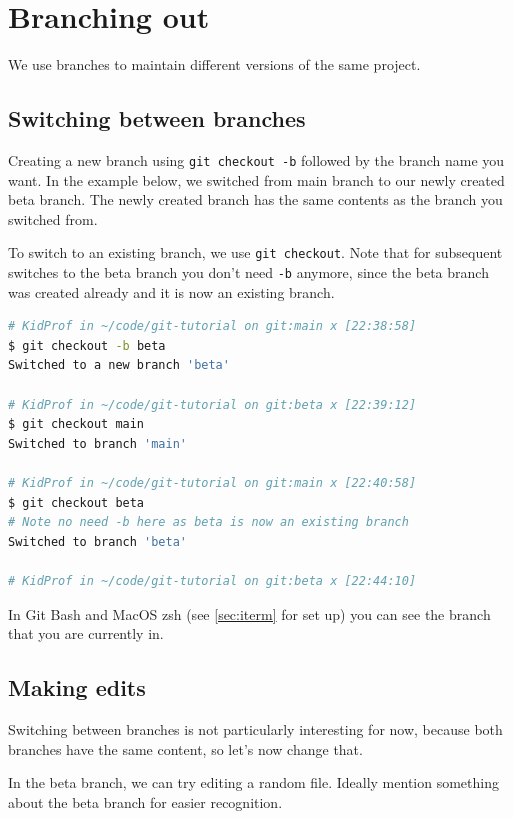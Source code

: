 \section{Branching out}
\label{sec:branch}

We use branches to maintain different versions of the same project. 

\subsection*{Switching between branches}

Creating a new branch using \texttt{git checkout -b} followed by the branch name you want. In the example below, we switched from main branch to our newly created beta branch. The newly created branch has the same contents as the branch you switched from.

To switch to an existing branch, we use \texttt{git checkout}. Note that for subsequent switches to the beta branch you don't need \texttt{-b} anymore, since the beta branch was created already and it is now an existing branch.

\begin{lstlisting}[language=bash]
# KidProf in ~/code/git-tutorial on git:main x [22:38:58]
$ git checkout -b beta
Switched to a new branch 'beta'

# KidProf in ~/code/git-tutorial on git:beta x [22:39:12]
$ git checkout main
Switched to branch 'main'

# KidProf in ~/code/git-tutorial on git:main x [22:40:58]
$ git checkout beta
# Note no need -b here as beta is now an existing branch
Switched to branch 'beta'

# KidProf in ~/code/git-tutorial on git:beta x [22:44:10]
\end{lstlisting}

In Git Bash and MacOS zsh (see \cref{sec:iterm} for set up) you can see the branch that you are currently in.

\subsection*{Making edits}

Switching between branches is not particularly interesting for now, because both branches have the same content, so let's now change that.

In the beta branch, we can try editing a random file. Ideally mention something about the beta branch for easier recognition.

